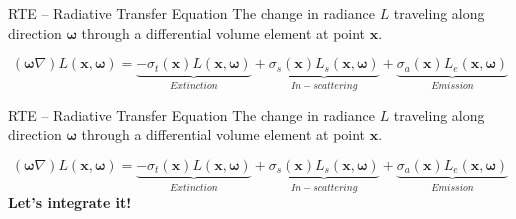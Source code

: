 \documentclass[
  english,            %
  aspectratio=169,    %
]{tumbeamer}
\newcommand\bx[0]{\bm{x}}
\newcommand\bomega[0]{\bm{\omega}}
\begin{document}
\begin{frame}{RTE -- Radiative Transfer Equation}
    The change in radiance $L$ traveling along direction $\boldsymbol{\omega}$
    through a differential volume element at point $\boldsymbol{x}$.
    \begin{figure}[ht]
        \centering
        \scalebox{.7}{
            
        }
    \end{figure}
    \begin{equation} 
        \label{eq:RTE}
        (\bomega \nabla)L(\bx,\bomega) =
        \underbrace{ - \sigma_t(\bx)L(\bx,\bomega)}
        _{Extinction}
        + 
        \underbrace{\sigma_s(\bx)L_s(\bx,\bomega)}
        _{In-scattering}
        + 
        \underbrace{\sigma_a(\bx)L_e(\bx,\bomega)}
        _{Emission}
    \end{equation}
\end{frame}

\begin{frame}{RTE -- Radiative Transfer Equation}
    The change in radiance $L$ traveling along direction $\boldsymbol{\omega}$
    through a differential volume element at point $\boldsymbol{x}$.
    \begin{figure}[ht]
        \centering
        \scalebox{.7}{
            
        }
    \end{figure}
    \begin{equation} 
        \label{eq:RTE}
        (\bomega \nabla)L(\bx,\bomega) =
        \underbrace{ - \sigma_t(\bx)L(\bx,\bomega)}
        _{Extinction}
        + 
        \underbrace{\sigma_s(\bx)L_s(\bx,\bomega)}
        _{In-scattering}
        + 
        \underbrace{\sigma_a(\bx)L_e(\bx,\bomega)}
        _{Emission}
    \end{equation}
    \centering
    \vfill
    \textbf{Let's integrate it!}
\end{frame}
\end{document}
